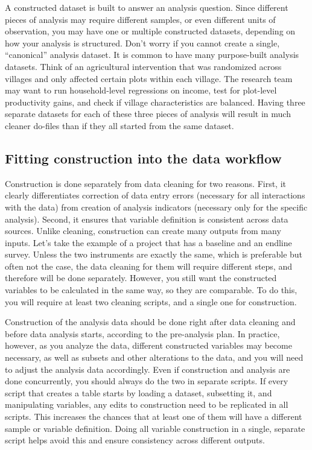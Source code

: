 A constructed dataset is built to answer an analysis question.
Since different pieces of analysis may require different samples,
or even different units of observation,
you may have one or multiple constructed datasets,
depending on how your analysis is structured.
Don't worry if you cannot create a single, ``canonical'' analysis dataset.
It is common to have many purpose-built analysis datasets.
Think of an agricultural intervention that was randomized across villages
and only affected certain plots within each village.
The research team may want to run household-level regressions on income,
test for plot-level productivity gains,
and check if village characteristics are balanced.
Having three separate datasets for each of these three pieces of analysis
will result in much cleaner do-files than if they all started from the same dataset.

\subsection{Fitting construction into the data workflow}
Construction is done separately from data cleaning for two reasons.
First, it clearly differentiates correction of data entry errors
(necessary for all interactions with the data)
from creation of analysis indicators (necessary only for the specific analysis).
Second, it ensures that variable definition is consistent across data sources.
Unlike cleaning, construction can create many outputs from many inputs.
Let's take the example of a project that has a baseline and an endline survey.
Unless the two instruments are exactly the same,
which is preferable but often not the case,
the data cleaning for them will require different steps,
and therefore will be done separately.
However, you still want the constructed variables to be calculated in the same way, so they are comparable.
To do this, you will require at least two cleaning scripts,
and a single one for construction.

Construction of the analysis data should be done right after data cleaning and before data analysis starts,
according to the pre-analysis plan.
In practice, however, as you analyze the data,
different constructed variables may become necessary,
as well as subsets and other alterations to the data,
and you will need to adjust the analysis data accordingly.
Even if construction and analysis are done concurrently,
you should always do the two in separate scripts.
If every script that creates a table starts by loading a dataset,
subsetting it, and manipulating variables,
any edits to construction need to be replicated in all scripts.
This increases the chances that at least one of them will have a different sample or variable definition.
Doing all variable construction in a single, separate script helps
avoid this and ensure consistency across different outputs.

